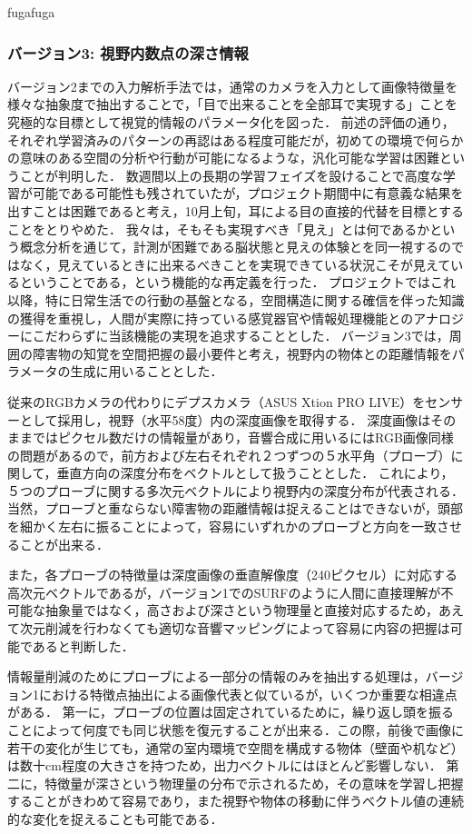 fugafuga

\newpage

\subsubsection{バージョン3: 視野内数点の深さ情報}

バージョン2までの入力解析手法では，通常のカメラを入力として画像特徴量を様々な抽象度で抽出することで，「目で出来ることを全部耳で実現する」ことを究極的な目標として視覚的情報のパラメータ化を図った．
前述の評価の通り，それぞれ学習済みのパターンの再認はある程度可能だが，初めての環境で何らかの意味のある空間の分析や行動が可能になるような，汎化可能な学習は困難ということが判明した．
数週間以上の長期の学習フェイズを設けることで高度な学習が可能である可能性も残されていたが，プロジェクト期間中に有意義な結果を出すことは困難であると考え，10月上旬，耳による目の直接的代替を目標とすることをとりやめた．
我々は，そもそも実現すべき「見え」とは何であるかという概念分析を通じて，計測が困難である脳状態と見えの体験とを同一視するのではなく，見えているときに出来るべきことを実現できている状況こそが見えているということである，という機能的な再定義を行った．
プロジェクトではこれ以降，特に日常生活での行動の基盤となる，空間構造に関する確信を伴った知識の獲得を重視し，人間が実際に持っている感覚器官や情報処理機能とのアナロジーにこだわらずに当該機能の実現を追求することとした．
バージョン3では，周囲の障害物の知覚を空間把握の最小要件と考え，視野内の物体との距離情報をパラメータの生成に用いることとした．

従来のRGBカメラの代わりにデプスカメラ（ASUS Xtion PRO LIVE）をセンサーとして採用し，視野（水平58度）内の深度画像を取得する．
深度画像はそのままではピクセル数だけの情報量があり，音響合成に用いるにはRGB画像同様の問題があるので，前方および左右それぞれ２つずつの５水平角（プローブ）に関して，垂直方向の深度分布をベクトルとして扱うこととした．
これにより，５つのプローブに関する多次元ベクトルにより視野内の深度分布が代表される．
当然，プローブと重ならない障害物の距離情報は捉えることはできないが，頭部を細かく左右に振ることによって，容易にいずれかのプローブと方向を一致させることが出来る．

また，各プローブの特徴量は深度画像の垂直解像度（240ピクセル）に対応する高次元ベクトルであるが，バージョン1でのSURFのように人間に直接理解が不可能な抽象量ではなく，高さおよび深さという物理量と直接対応するため，あえて次元削減を行わなくても適切な音響マッピングによって容易に内容の把握は可能であると判断した．

情報量削減のためにプローブによる一部分の情報のみを抽出する処理は，バージョン1における特徴点抽出による画像代表と似ているが，いくつか重要な相違点がある．
第一に，プローブの位置は固定されているために，繰り返し頭を振ることによって何度でも同じ状態を復元することが出来る．この際，前後で画像に若干の変化が生じても，通常の室内環境で空間を構成する物体（壁面や机など）は数十cm程度の大きさを持つため，出力ベクトルにはほとんど影響しない．
第二に，特徴量が深さという物理量の分布で示されるため，その意味を学習し把握することがきわめて容易であり，また視野や物体の移動に伴うベクトル値の連続的な変化を捉えることも可能である．

